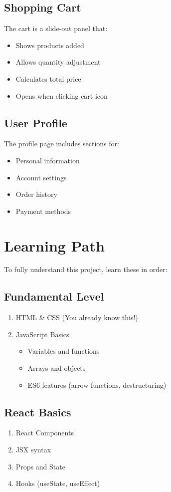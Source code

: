 \documentclass{article}
\begin{document}
\subsection{Shopping Cart}
The cart is a slide-out panel that:
\begin{itemize}
    \item Shows products added
    \item Allows quantity adjustment
    \item Calculates total price
    \item Opens when clicking cart icon
\end{itemize}

\subsection{User Profile}
The profile page includes sections for:
\begin{itemize}
    \item Personal information
    \item Account settings
    \item Order history
    \item Payment methods
\end{itemize}

\section{Learning Path}
To fully understand this project, learn these in order:

\subsection{Fundamental Level}
\begin{enumerate}
    \item HTML \& CSS (You already know this!)
    \item JavaScript Basics
    \begin{itemize}
        \item Variables and functions
        \item Arrays and objects
        \item ES6 features (arrow functions, destructuring)
    \end{itemize}
\end{enumerate}

\subsection{React Basics}
\begin{enumerate}
    \item React Components
    \item JSX syntax
    \item Props and State
    \item Hooks (useState, useEffect)
\end{enumerate}
\end{document}
